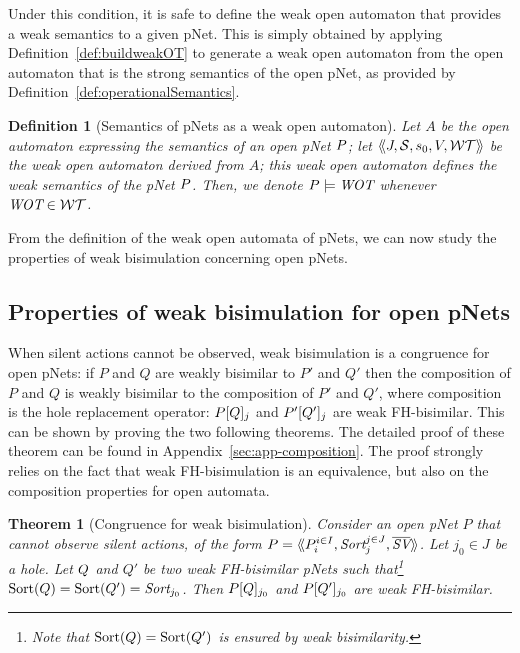 \documentclass{lmcs}
\newcommand{\TODO}[1]{\textcolor{red}{\textbf{[TODO:#1]}}}
\newtheorem{theorem}{Theorem}
\newtheorem{definition}{Definition}
\begin{document}

Under this condition, it is safe to define the weak open automaton that provides a weak semantics to a given pNet. This is simply obtained by applying Definition~\ref{def:buildweakOT} to generate a weak open automaton from the open automaton that is the strong semantics of the open pNet, as provided by Definition~\ref{def:operationalSemantics}.

\begin{definition}[Semantics of pNets as a weak open automaton]
Let $A$ be the open automaton expressing the semantics of an open pNet $P$; let $\langle\hspace{-0.45ex}\langle J,\mathcal{S},s_0, V, \mathcal{WT}\rangle\hspace{-0.45ex}\rangle$ be the weak open automaton derived from $A$; this weak open automaton defines the weak semantics of the pNet $P$. Then, we denote $\pNet \models \WOT$ whenever $\WOT\in\WT$.
\end{definition}

From the definition of the weak open automata of pNets, we can now study the properties of weak bisimulation concerning open pNets.

\subsection{Properties of weak bisimulation for open pNets}

When silent actions cannot be observed, weak bisimulation is a congruence for open pNets: if $P$ and $Q$ are weakly bisimilar to $P'$ and $Q'$ then the composition of $P$ and $Q$ is weakly bisimilar to the composition of $P'$ and $Q'$, where composition is the hole replacement operator: 	$P[Q]_{j}$ and 
	$P'[Q']_{j}$ are weak FH-bisimilar. This can be shown by proving the two following theorems.
The detailed proof of these theorem can be found in Appendix~\ref{sec:app-composition}. The proof strongly relies on the fact that weak FH-bisimulation is an equivalence, but also on the composition properties for open automata.

\begin{theorem}[Congruence for  weak bisimulation]\label{weak-thm-congr-eq}
	Consider an open pNet $P$
 that cannot observe silent actions, of the form 	$\pNet = \mylangle \pNet_i^{i\in I}, \Sort_j^{j\in J}, 
	\set{\symb{SV}}\myrangle$.
	Let $j_0\in J$ be a hole. Let $Q$ and $Q'$ be two weak FH-bisimilar pNets such that\footnote{Note that $\operatorname{Sort}(Q)=\operatorname{Sort}(Q')$ is 
	ensured by 
	weak bisimilarity.} 
	$\Sortop(\pNetQ)=\Sortop(\pNetQ')=\Sort_{j_0}$. Then 
	$P[Q]_{j_0}$ and 
	$P[Q']_{j_0}$ are weak FH-bisimilar.
\end{theorem}
\end{document}
